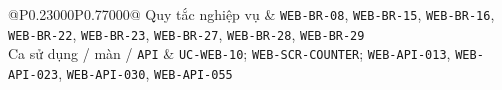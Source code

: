 \begin{longtable}{@{}P{0.23000\SRSWidth}P{0.77000\SRSWidth}@{}}
Quy tắc nghiệp vụ & \texttt{WEB-\allowbreak{}BR-\allowbreak{}08}, \texttt{WEB-\allowbreak{}BR-\allowbreak{}15}, \texttt{WEB-\allowbreak{}BR-\allowbreak{}16}, \texttt{WEB-\allowbreak{}BR-\allowbreak{}22}, \texttt{WEB-\allowbreak{}BR-\allowbreak{}23}, \texttt{WEB-\allowbreak{}BR-\allowbreak{}27}, \texttt{WEB-\allowbreak{}BR-\allowbreak{}28}, \texttt{WEB-\allowbreak{}BR-\allowbreak{}29} \\[3pt]
Ca sử dụng /\allowbreak{} màn /\allowbreak{} \texttt{API} & \texttt{UC-\allowbreak{}WEB-\allowbreak{}10}; \texttt{WEB-\allowbreak{}SCR-\allowbreak{}COUNTER}; \texttt{WEB-\allowbreak{}API-\allowbreak{}013}, \texttt{WEB-\allowbreak{}API-\allowbreak{}023}, \texttt{WEB-\allowbreak{}API-\allowbreak{}030}, \texttt{WEB-\allowbreak{}API-\allowbreak{}055} \\[3pt]
\end{longtable}
\endgroup

